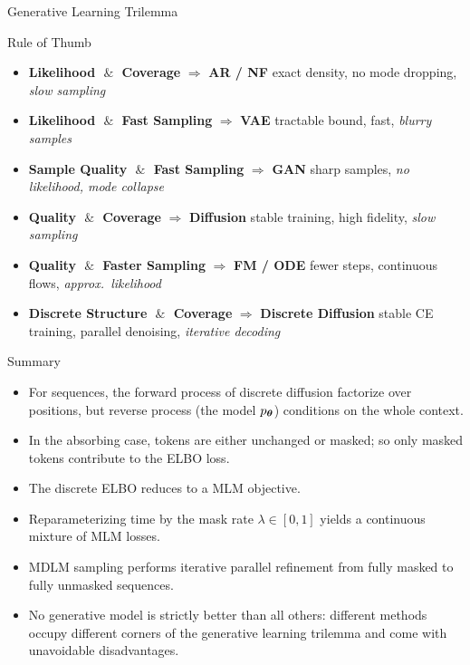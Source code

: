 \documentclass{beamer}
\begin{document}
\begin{frame}{Generative Learning Trilemma}
	\begin{block}{Rule of Thumb}
	\small
		\begin{itemize}
			\item \textbf{Likelihood $\;\&\;$ Coverage} $\Rightarrow$ 
			\textbf{AR / NF}  
			\hfill exact density, no mode dropping, \textit{slow sampling}

			\item \textbf{Likelihood $\;\&\;$ Fast Sampling} $\Rightarrow$ 
			\textbf{VAE}  
			\hfill tractable bound, fast, \textit{blurry samples}

			\item \textbf{Sample Quality $\;\&\;$ Fast Sampling} $\Rightarrow$ 
			\textbf{GAN}  
			\hfill sharp samples, \textit{no likelihood, mode collapse}

			\item \textbf{Quality $\;\&\;$ Coverage} $\Rightarrow$ 
			\textbf{Diffusion}  
			\hfill stable training, high fidelity, \textit{slow sampling}

			\item \textbf{Quality $\;\&\;$ Faster Sampling} $\Rightarrow$ 
			\textbf{FM / ODE}  
			\hfill fewer steps, continuous flows, \textit{approx.\ likelihood}

			\item \textbf{Discrete Structure $\;\&\;$ Coverage} $\Rightarrow$ 
			\textbf{Discrete Diffusion}  
			\hfill stable CE training, parallel denoising, \textit{iterative decoding}
		\end{itemize}
	\end{block}
\end{frame}
\begin{frame}{Summary}
	\begin{itemize}
		\item For sequences, the forward process of discrete diffusion factorize over positions, but
		reverse process (the model $p_{\boldsymbol{\theta}}$) conditions on the whole context.
		\vfill
		\item In the absorbing case, tokens are either unchanged or masked; so only masked tokens contribute to the ELBO loss.
		\vfill
		\item The discrete ELBO reduces to a MLM objective.
		\vfill
		\item Reparameterizing time by the mask rate $\lambda\in[0,1]$ yields a continuous mixture of MLM losses.
		\vfill
		\item MDLM sampling performs iterative parallel refinement from fully masked to fully unmasked sequences.
		\vfill
		\item No generative model is strictly better than all others: different methods occupy different corners of the generative learning trilemma and come with unavoidable disadvantages.
	\end{itemize}
\end{frame}
\end{document}
